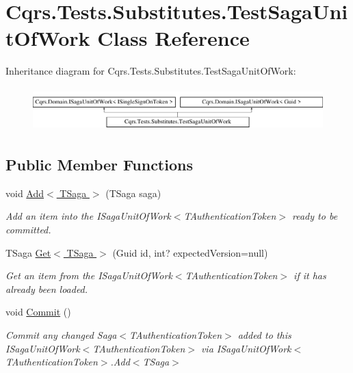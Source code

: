 \hypertarget{classCqrs_1_1Tests_1_1Substitutes_1_1TestSagaUnitOfWork}{}\section{Cqrs.\+Tests.\+Substitutes.\+Test\+Saga\+Unit\+Of\+Work Class Reference}
\label{classCqrs_1_1Tests_1_1Substitutes_1_1TestSagaUnitOfWork}
Inheritance diagram for Cqrs.\+Tests.\+Substitutes.\+Test\+Saga\+Unit\+Of\+Work\+:\begin{figure}[H]
\begin{center}
\leavevmode
\includegraphics[height=1.696970cm]{classCqrs_1_1Tests_1_1Substitutes_1_1TestSagaUnitOfWork}
\end{center}
\end{figure}
\subsection*{Public Member Functions}
\begin{DoxyCompactItemize}
\item 
void \hyperlink{classCqrs_1_1Tests_1_1Substitutes_1_1TestSagaUnitOfWork_a9469938dc87569d5fa29aea5c97e610f_a9469938dc87569d5fa29aea5c97e610f}{Add$<$ T\+Saga $>$} (T\+Saga saga)
\begin{DoxyCompactList}\small\item\em Add an item into the I\+Saga\+Unit\+Of\+Work$<$\+T\+Authentication\+Token$>$ ready to be committed. \end{DoxyCompactList}\item 
T\+Saga \hyperlink{classCqrs_1_1Tests_1_1Substitutes_1_1TestSagaUnitOfWork_a5b301e0f8efa469bcd164f032fffad98_a5b301e0f8efa469bcd164f032fffad98}{Get$<$ T\+Saga $>$} (Guid id, int? expected\+Version=null)
\begin{DoxyCompactList}\small\item\em Get an item from the I\+Saga\+Unit\+Of\+Work$<$\+T\+Authentication\+Token$>$ if it has already been loaded. \end{DoxyCompactList}\item 
void \hyperlink{classCqrs_1_1Tests_1_1Substitutes_1_1TestSagaUnitOfWork_ab50323c2f6a97c5f7eefa0d718dd7053_ab50323c2f6a97c5f7eefa0d718dd7053}{Commit} ()
\begin{DoxyCompactList}\small\item\em Commit any changed Saga$<$\+T\+Authentication\+Token$>$ added to this I\+Saga\+Unit\+Of\+Work$<$\+T\+Authentication\+Token$>$ via I\+Saga\+Unit\+Of\+Work$<$\+T\+Authentication\+Token$>$.\+Add$<$\+T\+Saga$>$ \end{DoxyCompactList}\end{DoxyCompactItemize}
